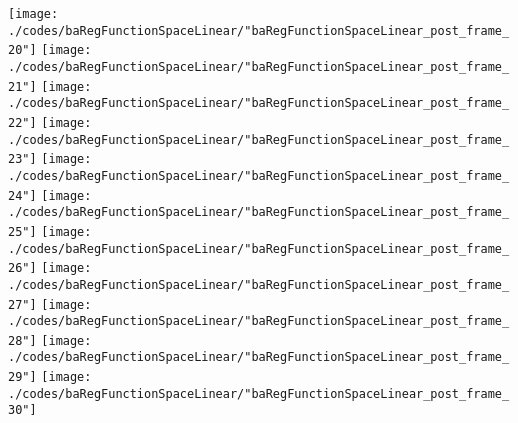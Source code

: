 \begin{frame}{\insertsection}
\begin{center}
{\begin{animateinline}{15}
				 \texttt{[image: ./codes/baRegFunctionSpaceLinear/"baRegFunctionSpaceLinear\_post\_frame\_20"]}\newframe
				 \texttt{[image: ./codes/baRegFunctionSpaceLinear/"baRegFunctionSpaceLinear\_post\_frame\_21"]}\newframe
				 \texttt{[image: ./codes/baRegFunctionSpaceLinear/"baRegFunctionSpaceLinear\_post\_frame\_22"]}\newframe
				 \texttt{[image: ./codes/baRegFunctionSpaceLinear/"baRegFunctionSpaceLinear\_post\_frame\_23"]}\newframe
				 \texttt{[image: ./codes/baRegFunctionSpaceLinear/"baRegFunctionSpaceLinear\_post\_frame\_24"]}\newframe
				 \texttt{[image: ./codes/baRegFunctionSpaceLinear/"baRegFunctionSpaceLinear\_post\_frame\_25"]}\newframe
				 \texttt{[image: ./codes/baRegFunctionSpaceLinear/"baRegFunctionSpaceLinear\_post\_frame\_26"]}\newframe
				 \texttt{[image: ./codes/baRegFunctionSpaceLinear/"baRegFunctionSpaceLinear\_post\_frame\_27"]}\newframe
				 \texttt{[image: ./codes/baRegFunctionSpaceLinear/"baRegFunctionSpaceLinear\_post\_frame\_28"]}\newframe
				 \texttt{[image: ./codes/baRegFunctionSpaceLinear/"baRegFunctionSpaceLinear\_post\_frame\_29"]}\newframe
				 \texttt{[image: ./codes/baRegFunctionSpaceLinear/"baRegFunctionSpaceLinear\_post\_frame\_30"]}
			 \end{animateinline}
			}
	\end{center}
    
\end{frame}

